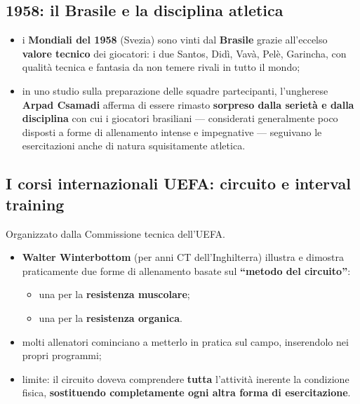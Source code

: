 \subsection{1958: il Brasile e la disciplina atletica}

\begin{itemize}
  \item i \textbf{Mondiali del 1958} (Svezia) sono vinti dal \textbf{Brasile} grazie all'eccelso
    \textbf{valore tecnico} dei giocatori: i due Santos, Didì, Vavà, Pelè, Garincha, con qualità
    tecnica e fantasia da non temere rivali in tutto il mondo;
  \item in uno studio sulla preparazione delle squadre partecipanti, l'ungherese \textbf{Arpad
    Csamadi} afferma di essere rimasto \textbf{sorpreso dalla serietà e dalla disciplina} con cui i
    giocatori brasiliani --- considerati generalmente poco disposti a forme di allenamento intense
    e impegnative --- seguivano le esercitazioni anche di natura squisitamente atletica.
\end{itemize}

\subsection{I corsi internazionali UEFA: circuito e interval training}

Organizzato dalla Commissione tecnica dell'UEFA.
\begin{itemize}
  \item \textbf{Walter Winterbottom} (per anni CT dell'Inghilterra) illustra e dimostra
    praticamente due forme di allenamento basate sul \textbf{``metodo del circuito''}:
    \begin{itemize}
      \item una per la \textbf{resistenza muscolare};
      \item una per la \textbf{resistenza organica}.
    \end{itemize}
  \item molti allenatori cominciano a metterlo in pratica sul campo, inserendolo nei propri
    programmi;
  \item limite: il circuito doveva comprendere \textbf{tutta} l'attività inerente la condizione
    fisica, \textbf{sostituendo completamente ogni altra forma di esercitazione}.
\end{itemize}

